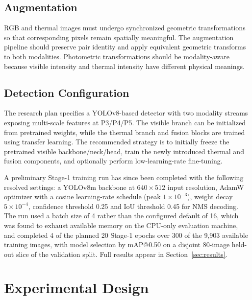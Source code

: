 \documentclass[conference]{IEEEtran}
\begin{document}
\subsection{Augmentation}

RGB and thermal images must undergo synchronized geometric transformations so that corresponding pixels remain spatially meaningful. The augmentation pipeline should preserve pair identity and apply equivalent geometric transforms to both modalities. Photometric transformations should be modality-aware because visible intensity and thermal intensity have different physical meanings.

\subsection{Detection Configuration}

The research plan specifies a YOLOv8-based detector with two modality streams exposing multi-scale features at P3/P4/P5. The visible branch can be initialized from pretrained weights, while the thermal branch and fusion blocks are trained using transfer learning. The recommended strategy is to initially freeze the pretrained visible backbone/neck/head, train the newly introduced thermal and fusion components, and optionally perform low-learning-rate fine-tuning.

A preliminary Stage-1 training run has since been completed with the
following resolved settings: a YOLOv8m \cite{yolov8} backbone at
$640\times512$ input resolution, AdamW optimizer with a cosine learning-rate
schedule (peak $1\times10^{-3}$), weight decay $5\times10^{-4}$,
confidence threshold 0.25 and IoU threshold 0.45 for NMS decoding.
The run used a batch size of 4 rather than the configured default of
16, which was found to exhaust available memory on the CPU-only
evaluation machine, and completed 4 of the planned 20 Stage-1 epochs
over 300 of the 9{,}903 available training images, with model
selection by mAP@0.50 on a disjoint 80-image held-out slice of the
validation split. Full results appear in
Section~\ref{sec:results}.


\section{Experimental Design}
\end{document}
